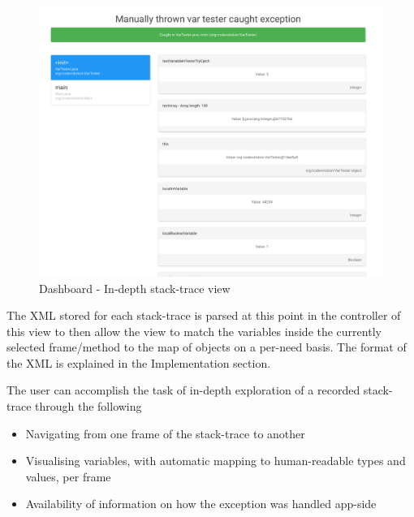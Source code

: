 \begin{figure}[H]
  \centering
    \includegraphics[width=\textwidth]{dashboard-exception.png} 
  \caption[Dashboard - In-depth stack-trace view]{Dashboard - In-depth stack-trace view}
\end{figure}

The XML stored for each stack-trace is parsed at this point in the controller of this view to then allow the view to match the variables inside the currently selected frame/method to the map of objects on a per-need basis. The format of the XML is explained in the Implementation section.

The user can accomplish the task of in-depth exploration of a recorded stack-trace through the following
\begin{itemize}
  \item Navigating from one frame of the stack-trace to another
  \item Visualising variables, with automatic mapping to human-readable types and values, per frame
  \item Availability of information on how the exception was handled app-side
\end{itemize}



\newpage